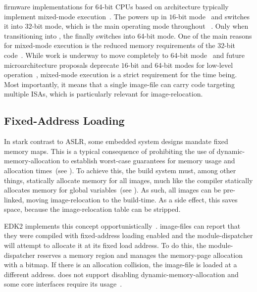 \Gls{firmware} implementations for 64-bit \glspl{CPU} based on  architecture typically implement mixed-mode execution~\cite{intel-fsp}. The  powers up in $16$-bit mode~\cite{ia32} and  switches it into $32$-bit mode, which is the main operating mode throughout ~\cite{edk2}. Only when transitioning into , the  finally switches into 64-bit mode. One of the main reasons for mixed-mode execution is the reduced memory requirements of the $32$-bit code~\cite{mixed-mode-1,mixed-mode-2}. While work is underway to move  completely to 64-bit mode~\cite{mixed-mode-1,mixed-mode-2} and future microarchitecture proposals deprecate $16$-bit and 64-bit modes for low-level operation~\cite{x86s}, mixed-mode execution is a strict requirement for the time being. Most importantly, it means that a single \gls{image-file} can carry code targeting multiple \glspl{ISA}, which is particularly relevant for \gls{image-relocation}.

\subsection{Fixed-Address Loading}
\label{sec:fixed-addr}

In stark contrast to \gls{ASLR}, some embedded system designs mandate fixed memory maps. This is a typical consequence of prohibiting the use of \gls{dynamic-memory-allocation} to establish worst-case guarantees for memory usage and allocation times~(see ). To achieve this, the build system must, among other things, statically allocate memory for all \glspl{image}, much like the compiler statically allocates memory for global variables~(see ). As such, all \glspl{image} can be pre-linked, moving \gls{image-relocation} to the build-time. As a side effect, this saves space, because the \gls{image-relocation} table can be stripped.

\Gls{EDK2} implements this concept opportunistically~\cite{edk2}. \Glspl{image-file} can report that they were compiled with fixed-address loading enabled and the \gls{module-dispatcher} will attempt to allocate it at its fixed load address. To do this, the \gls{module-dispatcher} reserves a memory region and manages the \gls{memory-page} allocation with a bitmap. If there is an allocation collision, the \gls{image-file} is loaded at a different address.  does not support disabling \gls{dynamic-memory-allocation} and some core interfaces require its usage~\cite{pi-spec,uefi-spec}.

